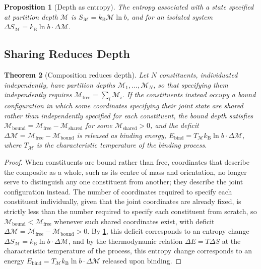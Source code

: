 \documentclass[11pt,twocolumn,a4paper]{article}
\theoremstyle{plain}
\newtheorem{theorem}{Theorem}[section]
\newtheorem{proposition}[theorem]{Proposition}
\theoremstyle{definition}
\theoremstyle{remark}
\newcommand{\kB}{k_{\mathrm{B}}}
\newcommand{\Depth}{\mathcal{M}}
\newcommand{\Mfree}{\Depth_{\mathrm{free}}}
\newcommand{\Mbound}{\Depth_{\mathrm{bound}}}
\begin{document}
\begin{proposition}[Depth as entropy]
\label{prop:depth-entropy}
The entropy associated with a state specified at partition depth $\Depth$
is $S_\Depth = \kB \Depth \ln b$, and for an isolated system $\Delta
S_\Depth = \kB \ln b \cdot \Delta \Depth$.
\end{proposition}

\subsection{Sharing Reduces Depth}

\begin{theorem}[Composition reduces depth]
\label{thm:composition}
Let $N$ constituents, individuated independently, have partition depths
$\Depth_1, \ldots, \Depth_N$, so that specifying them independently requires
$\Mfree = \sum_i \Depth_i$. If the constituents instead occupy a bound
configuration in which some coordinates specifying their joint state are
shared rather than independently specified for each constituent, the bound
depth satisfies $\Mbound = \Mfree - \Depth_{\text{shared}}$ for some
$\Depth_{\text{shared}} > 0$, and the deficit $\Delta\Depth = \Mfree -
\Mbound$ is released as binding energy, $E_{\mathrm{bind}} = T_\Depth \kB \ln
b \cdot \Delta \Depth$, where $T_\Depth$ is the characteristic temperature
of the binding process.
\end{theorem}

\begin{proof}
When constituents are bound rather than free, coordinates that describe the
composite as a whole, such as its centre of mass and orientation, no longer
serve to distinguish any one constituent from another; they describe the
joint configuration instead. The number of coordinates required to specify
each constituent individually, given that the joint coordinates are already
fixed, is strictly less than the number required to specify each
constituent from scratch, so $\Mbound < \Mfree$ whenever such shared
coordinates exist, with deficit $\Delta\Depth = \Mfree - \Mbound > 0$. By
\cref{prop:depth-entropy}, this deficit corresponds to an entropy change
$\Delta S_\Depth = \kB \ln b \cdot \Delta\Depth$, and by the thermodynamic
relation $\Delta E = T \Delta S$ at the characteristic temperature of the
process, this entropy change corresponds to an energy $E_{\mathrm{bind}} =
T_\Depth \kB \ln b \cdot \Delta \Depth$ released upon binding.
\end{proof}
\end{document}
